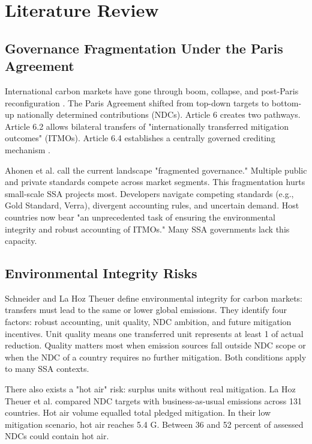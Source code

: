 \section{Literature Review}
\label{sec:lit-review}
\subsection{Governance Fragmentation Under the Paris Agreement}
\label{subsec:lit-governance}
International carbon markets have gone through boom, collapse, and post-Paris reconfiguration \cite{michaelowa-evolution}. The Paris Agreement shifted from top-down targets to bottom-up nationally determined contributions (NDCs). Article 6 creates two pathways. Article 6.2 allows bilateral transfers of "internationally transferred mitigation outcomes" (ITMOs). Article 6.4 establishes a centrally governed crediting mechanism \cite{ahonen-governance}.

Ahonen et al. \cite{ahonen-governance} call the current landscape "fragmented governance." Multiple public and private standards compete across market segments. This fragmentation hurts small-scale SSA projects most. Developers navigate competing standards (e.g., Gold Standard, Verra), divergent accounting rules, and uncertain demand. Host countries now bear "an unprecedented task of ensuring the environmental integrity and robust accounting of ITMOs." Many SSA governments lack this capacity.

\subsection{Environmental Integrity Risks}
\label{subsec:lit-risks}
Schneider and La Hoz Theuer \cite{schneider-integrity} define environmental integrity for carbon markets: transfers must lead to the same or lower global emissions. They identify four factors: robust accounting, unit quality, NDC ambition, and future mitigation incentives. Unit quality means one transferred unit represents at least 1 \tcooe of actual reduction. Quality matters most when emission sources fall outside NDC scope or when the NDC of a country requires no further mitigation. Both conditions apply to many SSA contexts.

There also exists a "hot air" risk: surplus units without real mitigation. La Hoz Theuer et al. \cite{theuer-transfers} compared NDC targets with business-as-usual emissions across 131 countries. Hot air volume equalled total pledged mitigation. In their low mitigation scenario, hot air reaches 5.4 G\tcooe. Between 36 and 52 percent of assessed NDCs could contain hot air.

